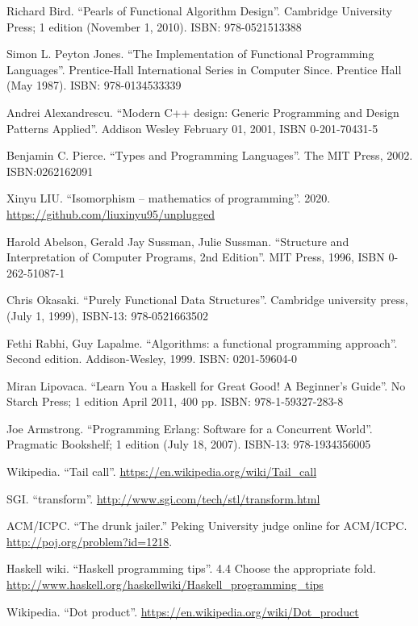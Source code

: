 \documentclass[b5paper]{article}
\begin{document}
\ifx\wholebook\relax \else
\begin{thebibliography}{99}

Richard Bird. ``Pearls of Functional Algorithm Design''. Cambridge University Press; 1 edition (November 1, 2010). ISBN: 978-0521513388

Simon L. Peyton Jones. ``The Implementation of Functional Programming Languages''. Prentice-Hall International Series in Computer Since. Prentice Hall (May 1987). ISBN: 978-0134533339

Andrei Alexandrescu. ``Modern C++ design: Generic Programming and Design Patterns Applied''. Addison Wesley February 01, 2001, ISBN 0-201-70431-5

Benjamin C. Pierce. ``Types and Programming Languages''. The MIT Press, 2002. ISBN:0262162091

Xinyu LIU. ``Isomorphism -- mathematics of programming''. 2020. \url{https://github.com/liuxinyu95/unplugged}

Harold Abelson, Gerald Jay Sussman, Julie Sussman. ``Structure and Interpretation of Computer Programs, 2nd Edition''. MIT Press, 1996, ISBN 0-262-51087-1

Chris Okasaki. ``Purely Functional Data Structures''. Cambridge university press, (July 1, 1999), ISBN-13: 978-0521663502

Fethi Rabhi, Guy Lapalme. ``Algorithms: a functional programming approach''. Second edition. Addison-Wesley, 1999. ISBN: 0201-59604-0

Miran Lipovaca. ``Learn You a Haskell for Great Good! A Beginner's Guide''. No Starch Press; 1 edition April 2011, 400 pp. ISBN: 978-1-59327-283-8

Joe Armstrong. ``Programming Erlang: Software for a Concurrent World''. Pragmatic Bookshelf; 1 edition (July 18, 2007). ISBN-13: 978-1934356005

Wikipedia. ``Tail call''. \url{https://en.wikipedia.org/wiki/Tail_call}

SGI. ``transform''. \url{http://www.sgi.com/tech/stl/transform.html}

ACM/ICPC. ``The drunk jailer.'' Peking University judge online for ACM/ICPC. \url{http://poj.org/problem?id=1218}.

Haskell wiki. ``Haskell programming tips''. 4.4 Choose the appropriate fold. \url{http://www.haskell.org/haskellwiki/Haskell_programming_tips}

Wikipedia. ``Dot product''. \url{https://en.wikipedia.org/wiki/Dot_product}

\end{thebibliography}

\expandafter\enddocument
\fi
\end{document}

